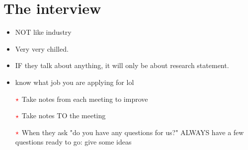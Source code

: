 \documentclass[10pt]{beamer}
\begin{document}
\section{The interview}
\begin{frame}
\begin{itemize}
	\item NOT like industry
	\item Very very chilled.
	\item IF they talk about anything, it will only be about research statement. 
	\item know what job you are applying for lol
	\item [{$\color{red}\star$}] Take notes from each meeting to improve
	\item [{$\color{red}\star$}] Take notes TO the meeting
	\item [{$\color{red}\star$}] When they ask "do you have any questions for us?" ALWAYS have a few questions ready to go: give some ideas
\end{itemize}

\end{frame}
\end{document}
